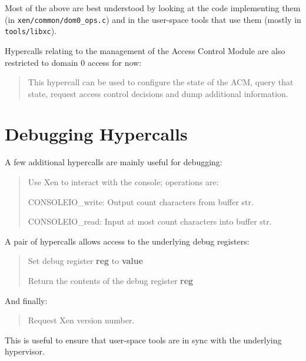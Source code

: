 \documentclass[11pt,twoside,final,openright]{report}
\newcommand{\hypercall}[1]{\vspace{2mm}{\sf #1}}
\begin{document}
Most of the above are best understood by looking at the code 
implementing them (in {\tt xen/common/dom0\_ops.c}) and in 
the user-space tools that use them (mostly in {\tt tools/libxc}). 

Hypercalls relating to the management of the Access Control Module are
also restricted to domain 0 access for now:

\begin{quote}

\hypercall{acm\_op(struct acm\_op * u\_acm\_op)}

This hypercall can be used to configure the state of the ACM, query
that state, request access control decisions and dump additional
information.

\end{quote}


\section{Debugging Hypercalls} 

A few additional hypercalls are mainly useful for debugging: 

\begin{quote} 
\hypercall{console\_io(int cmd, int count, char *str)}

Use Xen to interact with the console; operations are:

{CONSOLEIO\_write}: Output count characters from buffer str.

{CONSOLEIO\_read}: Input at most count characters into buffer str.
\end{quote} 

A pair of hypercalls allows access to the underlying debug registers: 
\begin{quote}
\hypercall{set\_debugreg(int reg, unsigned long value)}

Set debug register {\bf reg} to {\bf value} 

\hypercall{get\_debugreg(int reg)}

Return the contents of the debug register {\bf reg}
\end{quote}

And finally: 
\begin{quote}
\hypercall{xen\_version(int cmd)}

Request Xen version number.
\end{quote} 

This is useful to ensure that user-space tools are in sync 
with the underlying hypervisor. 
\end{document}
